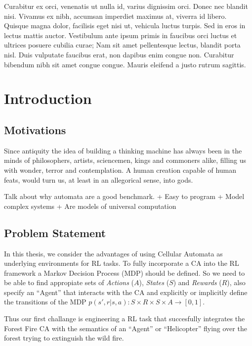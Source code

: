 \documentclass[
  openany]{book}
\begin{document}
Curabitur ex orci, venenatis ut nulla id, varius dignissim orci. Donec nec blandit nisi. Vivamus ex nibh, accumsan imperdiet maximus at, viverra id libero. Quisque magna dolor, facilisis eget nisi ut, vehicula luctus turpis. Sed in eros in lectus mattis auctor. Vestibulum ante ipsum primis in faucibus orci luctus et ultrices posuere cubilia curae; Nam sit amet pellentesque lectus, blandit porta nisl. Duis vulputate faucibus erat, non dapibus enim congue non. Curabitur bibendum nibh sit amet congue congue. Mauris eleifend a justo rutrum sagittis.

\newpage

\hypertarget{introduction}{%
\chapter{Introduction}\label{introduction}}

\hypertarget{motivations}{%
\section{Motivations}\label{motivations}}

Since antiquity the idea of building a thinking machine has always been in the minds of philosophers, artists, sciencemen, kings and commoners alike, filling us with wonder, terror and contemplation. A human creation capable of human feats, would turn us, at least in an allegorical sense, into gods.

Talk about why automata are a good benchmark.
+ Easy to program
+ Model complex systems
+ Are models of universal computation

\hypertarget{problem-statement}{%
\section{Problem Statement}\label{problem-statement}}

In this thesis, we consider the advantages of using Cellular Automata as underlying environments for RL tasks. To fully incorporate a CA into the RL framework a Markov Decision Process (MDP) should be defined. So we need to be able to find appropiate sets of \emph{Actions} (\(A\)), \emph{States} (\(S\)) and \emph{Rewards} (\(R\)), also specify an ``Agent'' that interacts with the CA and explicitly or implicitly define the transitions of the MDP \(p(s',r|s,a): S \times R \times S \times A \rightarrow [0,1]\).

Thus our first challange is engineering a RL task that succesfully integrates the Forest Fire CA with the semantics of an ``Agent'' or ``Helicopter'' flying over the forest trying to extinguish the wild fire.
\end{document}
